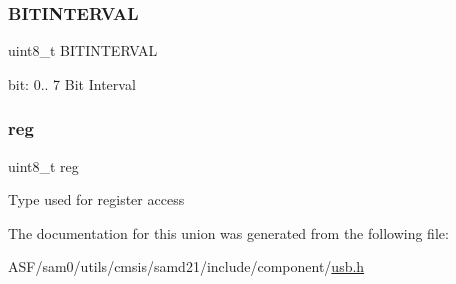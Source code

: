 \subsubsection{\texorpdfstring{BITINTERVAL}{BITINTERVAL}}
{\footnotesize\ttfamily uint8\+\_\+t B\+I\+T\+I\+N\+T\+E\+R\+V\+AL}

bit\+: 0.. 7 Bit Interval \mbox{\label{union_u_s_b___h_o_s_t___b_i_n_t_e_r_v_a_l___type_a9428adc9af4653a2050e2536b55dec8d}} 
\subsubsection{\texorpdfstring{reg}{reg}}
{\footnotesize\ttfamily uint8\+\_\+t reg}

Type used for register access 

The documentation for this union was generated from the following file\+:\begin{DoxyCompactItemize}
\item 
A\+S\+F/sam0/utils/cmsis/samd21/include/component/\mbox{\hyperlink{component_2usb_8h}{usb.\+h}}\end{DoxyCompactItemize}
